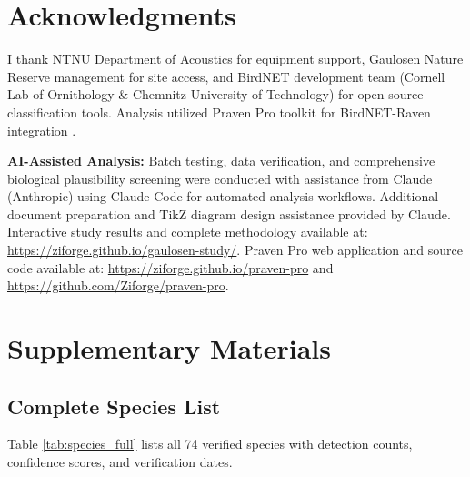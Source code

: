 \documentclass[twocolumn]{article}
\begin{document}
\section*{Acknowledgments}

I thank NTNU Department of Acoustics for equipment support, Gaulosen Nature Reserve management for site access, and BirdNET development team (Cornell Lab of Ornithology \& Chemnitz University of Technology) for open-source classification tools. Analysis utilized Praven Pro toolkit for BirdNET-Raven integration \citep{Redpath2025}.

\textbf{AI-Assisted Analysis:} Batch testing, data verification, and comprehensive biological plausibility screening were conducted with assistance from Claude (Anthropic) using Claude Code for automated analysis workflows. Additional document preparation and TikZ diagram design assistance provided by Claude. Interactive study results and complete methodology available at: \url{https://ziforge.github.io/gaulosen-study/}. Praven Pro web application and source code available at: \url{https://ziforge.github.io/praven-pro} and \url{https://github.com/Ziforge/praven-pro}.


\newpage
\onecolumn

\appendix
\section{Supplementary Materials}

\subsection{Complete Species List}

Table \ref{tab:species_full} lists all 74 verified species with detection counts, confidence scores, and verification dates.
\end{document}
